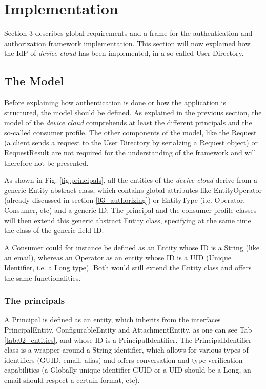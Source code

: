 \chapter{Implementation}
\label{cha:implementation}

Section 3 describes global requirements and a frame for the authentication and authorization framework implementation. This section will now explained how the IdP of \emph{device cloud} has been implemented, in a so-called User Directory.

\section{The Model}
Before explaining how authentication is done or how the application is structured, the model should be defined. As explained in the previous section, the model of the \emph{device cloud} comprehends at least the different principals and the so-called consumer profile. The other components of the model, like the Request (a client sends a request to the User Directory by serialzing a Request object) or RequestResult are not required for the understanding of the framework and will therefore not be presented.

As shown in Fig. \ref{fig:principals}, all the entities of the \emph{device cloud} derive from a generic Entity abstract class, which contains global attributes like EntityOperator (already discussed in section \ref{03_authorizing}) or EntityType (i.e. Operator, Consumer, etc) and a generic ID. The principal and the consumer profile classes will then extend this generic abstract Entity class, specifying at the same time the class of the generic field ID.

A Consumer could for instance be defined as an Entity whose ID is a String (like an email), whereas an Operator as an entity whose ID is a UID (Unique Identifier, i.e. a Long type). Both would still extend the Entity class and offers the same functionalities.

\subsection{The principals}
A Principal is defined as an entity, which inherits from the interfaces PrincipalEntity, ConfigurableEntity and AttachmentEntity, as one can see Tab \ref{tab:02_entities}, and whose ID is a PrincipalIdentifier. The PrincipalIdentifier class is a wrapper around a String identifier, which allows for various types of identifiers (GUID, email, alias) and offers conversation and type verification capabilities (a Globally unique identifier GUID or a UID should be a Long, an email should respect a certain format, etc).


